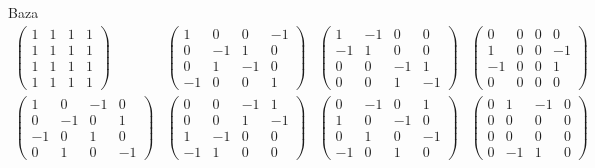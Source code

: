 \begin{frame}{Baza}
    \tiny
    \begin{align*}
        \begin{pmatrix}
            1&1&1&1\\
            1&1&1&1\\
            1&1&1&1\\
            1&1&1&1
        \end{pmatrix} &
        \begin{pmatrix}
            1&0&0&-1\\
            0&-1&1&0\\
            0&1&-1&0\\
            -1&0&0&1
        \end{pmatrix} &
        \begin{pmatrix}
            1&-1&0&0\\
            -1&1&0&0\\
            0&0&-1&1\\
            0&0&1&-1
        \end{pmatrix} &
        \begin{pmatrix}
            0&0&0&0\\
            1&0&0&-1\\
            -1&0&0&1\\
            0&0&0&0
        \end{pmatrix} \\
        \begin{pmatrix}
            1&0&-1&0\\
            0&-1&0&1\\
            -1&0&1&0\\
            0&1&0&-1
        \end{pmatrix} &
        \begin{pmatrix}
            0&0&-1&1\\
            0&0&1&-1\\
            1&-1&0&0\\
            -1&1&0&0
        \end{pmatrix} &
        \begin{pmatrix}
            0&-1&0&1\\
            1&0&-1&0\\
            0&1&0&-1\\
            -1&0&1&0
        \end{pmatrix} &
        \begin{pmatrix}
            0&1&-1&0\\
            0&0&0&0\\
            0&0&0&0\\
            0&-1&1&0
        \end{pmatrix}
    \end{align*}
\end{frame}

